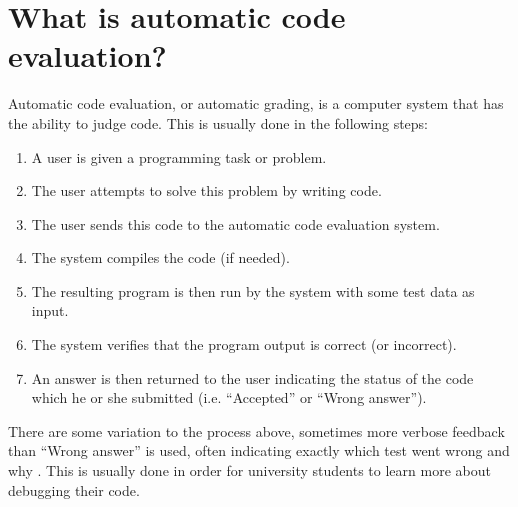 \section{What is automatic code evaluation?}
Automatic code evaluation, or automatic grading, is a computer system that has the ability to judge code. This is usually done in the following steps:
\begin{enumerate}
  \item A user is given a programming task or problem.
  \item The user attempts to solve this problem by writing code.
  \item The user sends this code to the automatic code evaluation system.
  \item The system compiles the code (if needed).
  \item The resulting program is then run by the system with some test data as input.
  \item The system verifies that the program output is correct (or incorrect). 
  \item An answer is then returned to the user indicating the status of the code which he or she submitted (i.e. ``Accepted'' or ``Wrong answer'').
\end{enumerate}
There are some variation to the process above, sometimes more verbose feedback than ``Wrong answer'' is used, often indicating exactly which test went wrong and why \cite{Gradebot}. This is usually done in order for university students to learn more about debugging their code.